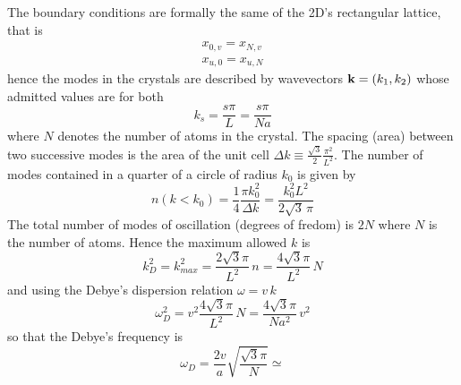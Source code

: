 The boundary conditions are formally the same of the 2D's rectangular lattice, that is 
\begin{gather*}
    x_{0,v} = x_{N,v} \\
    x_{u,0} = x_{u,N}
\end{gather*}
hence the modes in the crystals are described by wavevectors $\mathbf{k} = (k_1, k_2)$ whose admitted values are for both
$$k_{s} = \frac{s\pi}{L} = \frac{s\pi}{Na}$$ 
where $N$ denotes the number of atoms in the crystal. The spacing (area) between two successive modes is the area of the unit cell
$\Delta k \equiv \frac{\sqrt{3}}{2} \frac{\pi^2}{L^2}$. The number of modes contained in a quarter of a circle of radius $k_0$ is given by 
\begin{equation*}
    n(k < k_0) = \frac{1}{4} \frac{\pi k_0^2}{\Delta k} = \frac{k_0^2 L^2}{2\sqrt{3}\,\pi}
\end{equation*}
The total number of modes of oscillation (degrees of fredom) is $2N$ where $N$ is the number of atoms. Hence the maximum allowed $k$ is 
\begin{equation*}
    k_D^2 = k_{max}^2 = \frac{2 \sqrt{3} \pi}{L^2} \, n = \frac{4 \sqrt{3} \pi}{L^2} \, N
\end{equation*}
and using the Debye's dispersion relation $\omega = v \, k$
\begin{equation*}
    \omega_D^2 = v^2 \frac{4 \sqrt{3} \pi }{L^2} \, N = \frac{4 \sqrt{3} \pi }{N a^2} \, v^2 
\end{equation*}
so that the Debye's frequency is 
\begin{equation*}
    \omega_D = \frac{2v}{a} \sqrt{\frac{\sqrt{3} \pi }{N}} \simeq 
\end{equation*}